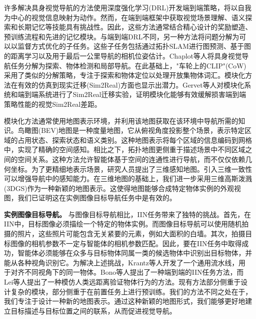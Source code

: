 许多解决具身视觉导航的方法使用深度强化学习(DRL)开发端到端策略，将以自我为中心的视觉信息映射为动作\cite{al2022zero, majumdar2022zson, yadav2023offline, zhu2017target}。然而，在端到端框架中获取视觉场景理解、语义探索和长期记忆等技能具有挑战性。因此，这些方法通常结合精心设计的奖励塑造\cite{choi2021image}、预训练流程\cite{yadav2023offline}和先进的记忆模块\cite{savinov2018semi, mezghan2022memory, wu2019bayesian}。与端到端DRL不同，另一种方法将问题分解为可以以监督方式优化的子任务。这些子任务包括通过拓扑SLAM进行图预测\cite{Chaplot_2020_CVPR}、基于图的距离学习\cite{hahn2021no, shah2021rapid}以及用于最后一公里导航的相机位姿估计\cite{wasserman2022lastmile}。Chaplot等人\cite{chaplot2020object}将具身视觉导航任务分解为探索、物体检测和局部导航。在此基础上，"车轮上的CLIP"(CoW)\cite{gadre2023cows}采用了类似的分解策略，专注于探索和物体定位以处理开放集物体词汇。模块化方法在有效的仿真到现实迁移(Sim2Real)方面也显示出潜力。Gervet等人\cite{gervet2023navigating}对模块化系统和端到端系统进行了Sim2Real迁移实验，证明模块化能够有效缓解损害端到端策略性能的视觉Sim2Real差距。

模块化方法通常使用地图表示环境，并利用该地图获取在该环境中导航所需的知识。鸟瞰图(BEV)地图\cite{liu2023bird, chaplot2020object, krantz2023navigating, lei2024instanceaware}是一种度量地图，它从俯视角度投影整个场景，表示特定区域的占用状态、探索状态和语义类别。这种地图表示将每个区域的信息编码到网格中，实现了精确的空间感知。相比之下，拓扑地图\cite{Chaplot_2020_CVPR, TSGM, Kwon_2023_CVPR}更侧重于描述场景中不同区域之间的空间关系。这种方法允许智能体基于空间的连通性进行导航，而不仅仅依赖几何坐标。为了更精细地表示场景，研究人员提出了三维感知地图\cite{chaplot2021seal, zhang20233d, tan2024self, liu2024volumetric}。引入三维一致性可以增强导航中的感知能力。在三维地图的基础上，我们进一步采用三维高斯泼溅(3DGS)\cite{kerbl3Dgaussians}作为一种新颖的地图表示。这使得地图能够合成特定物体实例的外观视图，我们已证明这在实例图像目标导航任务中是有效的。

\textbf{实例图像目标导航。} 与图像目标导航相比，IIN任务带来了独特的挑战。首先，在IIN中，目标图像必须描绘一个特定的物体实例。而图像目标导航可以使用随机拍摄的照片，这些照片可能包含无关紧要的元素，例如大面积的白墙。其次，拍摄目标图像的相机参数不一定与智能体的相机参数匹配。因此，要在IIN任务中取得成功，智能体必须能够在众多与目标物体同属一类的候选物体中识别出目标物体，并能从各种视角识别它。为解决上述挑战，Krantz等人\cite{krantz2023navigating}开发了一个通用流水线，用于对齐不同视角下的同一物体。Bono等人\cite{bono2023endtoend}提出了一种端到端的IIN任务方法，而Lei等人\cite{lei2024instanceaware}提出了一种模仿人类远距离验证物体行为的方法。现有方法部分侧重于设计复杂的模块\cite{krantz2023navigating, lei2024instanceaware}，部分侧重于在前置任务上进行预训练\cite{bono2023endtoend}。我们的方法不同之处在于，我们专注于设计一种新的地图表示。通过这种新颖的地图形式，我们能够更好地建立目标描述与目标位置之间的联系，从而促进视觉导航。